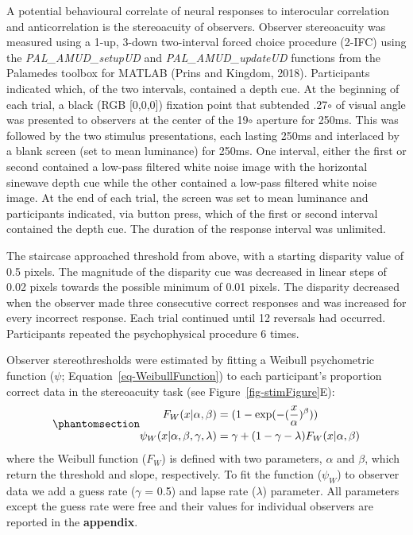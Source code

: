 \documentclass[
  12pt,
]{article}
\begin{document}
A potential behavioural correlate of neural responses to interocular
correlation and anticorrelation is the stereoacuity of observers.
Observer stereoacuity was measured using a 1-up, 3-down two-interval
forced choice procedure (2-IFC) using the \emph{PAL\_AMUD\_setupUD} and
\emph{PAL\_AMUD\_updateUD} functions from the Palamedes toolbox for
MATLAB (Prins and Kingdom, 2018). Participants indicated which, of the
two intervals, contained a depth cue. At the beginning of each trial, a
black (RGB {[}0,0,0{]}) fixation point that subtended .27\(\circ\) of
visual angle was presented to observers at the center of the 19\(\circ\)
aperture for 250ms. This was followed by the two stimulus presentations,
each lasting 250ms and interlaced by a blank screen (set to mean
luminance) for 250ms. One interval, either the first or second contained
a low-pass filtered white noise image with the horizontal sinewave depth
cue while the other contained a low-pass filtered white noise image. At
the end of each trial, the screen was set to mean luminance and
participants indicated, via button press, which of the first or second
interval contained the depth cue. The duration of the response interval
was unlimited.

The staircase approached threshold from above, with a starting disparity
value of 0.5 pixels. The magnitude of the disparity cue was decreased in
linear steps of 0.02 pixels towards the possible minimum of 0.01 pixels.
The disparity decreased when the observer made three consecutive correct
responses and was increased for every incorrect response. Each trial
continued until 12 reversals had occurred. Participants repeated the
psychophysical procedure 6 times.

Observer stereothresholds were estimated by fitting a Weibull
psychometric function (\(\psi\); Equation~\ref{eq-WeibullFunction}) to
each participant's proportion correct data in the stereoacuity task (see
Figure~\ref{fig-stimFigure}E):
\begin{equation}\protect\phantomsection\label{eq-WeibullFunction}{
\begin{aligned}
F_W(x|\alpha,\beta) &= (1 - \exp(-(\frac{x}{\alpha})^\beta)) \\
\psi_W(x|\alpha,\beta,\gamma,\lambda) &= \gamma + (1 - \gamma - \lambda)F_W(x|\alpha,\beta)
\end{aligned}
}\end{equation} where the Weibull function (\(F_W\)) is defined with two
parameters, \(\alpha\) and \(\beta\), which return the threshold and
slope, respectively. To fit the function (\(\psi_W\)) to observer data
we add a guess rate (\(\gamma\) = 0.5) and lapse rate (\(\lambda\))
parameter. All parameters except the guess rate were free and their
values for individual observers are reported in the \textbf{appendix}.
\end{document}
